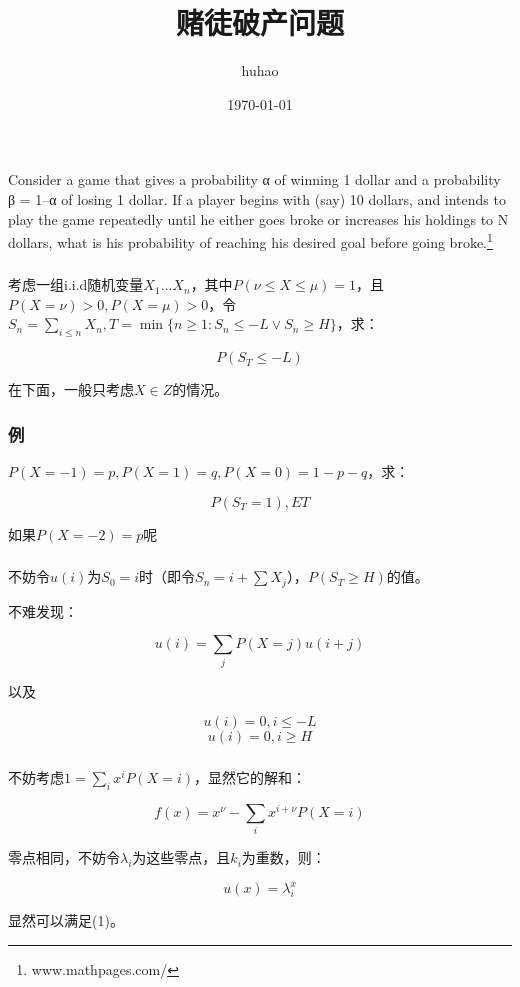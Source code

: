 \documentclass[10pt]{beamer}
\begin{document}
	\title{赌徒破产问题}
	\date{\today}
	\author{huhao}
	\maketitle
	\clearpage
	\begin{frame}
		\frametitle{}
		Consider a game that gives a probability α of winning 1 dollar and a probability β = 1–α of losing 1 dollar. If a player begins with (say) 10 dollars, and intends to play the game repeatedly until he either goes broke or increases his holdings to N dollars, what is his probability of reaching his desired goal before going broke.\footnote{www.mathpages.com/}
	\end{frame}
	\begin{frame}
		\frametitle{}
	
		考虑一组i.i.d随机变量$X_1\dots X_n$，其中$P(\nu\le X\le \mu)=1$，且$P(X=\nu)>0,P(X=\mu)>0$，令$S_n=\sum_{i\le n}X_n,T=\min\{n\ge 1:S_n\le -L\vee S_n\ge H\}$，求：

		$$
		P(S_{T}\le -L)
		$$

		在下面，一般只考虑$X\in Z$的情况。
	
	\end{frame}
	\begin{frame}
		\frametitle{例}
	
		$P(X=-1)=p,P(X=1)=q,P(X=0)=1-p-q$，求：

		$$
		P(S_T=1),ET
		$$

		如果$P(X=-2)=p$呢
	
	\end{frame}
	\begin{frame}
		\frametitle{}
	
		不妨令$u(i)$为$S_0=i$时（即令$S_n=i+\sum X_j$），$P(S_T\ge H)$的值。

		不难发现：

		\begin{equation}
			u(i)=\sum_{j}P(X=j)u(i+j) \tag{1}
		\end{equation}

		以及
		
		\begin{equation}
			u(i)=0,i\le -L\tag{2}
		\end{equation}
		\begin{equation}
			u(i)=0,i\ge H \tag{3}
		\end{equation}
	
	\end{frame}
	\begin{frame}
		\frametitle{}
	
		不妨考虑$1=\sum_i x^iP(X=i)$，显然它的解和：

		$$
		f(x)=x^\nu-\sum_i x^{i+\nu}P(X=i)
		$$

		零点相同，不妨令$\lambda_i$为这些零点，且$k_i$为重数，则：

		$$
		u(x)=\lambda_i^x
		$$

		显然可以满足(1)。
	
	\end{frame}
\end{document}
